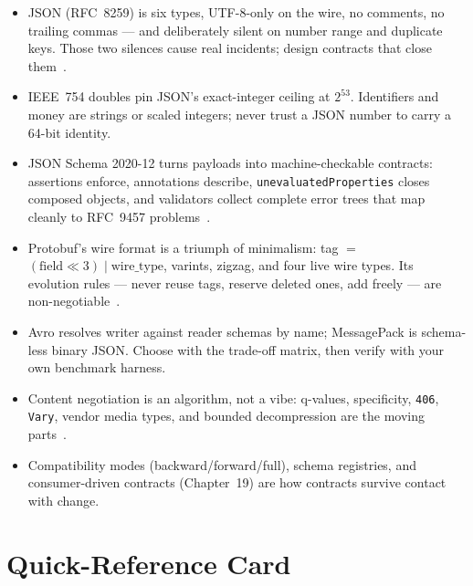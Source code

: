 \begin{itemize}
  \item JSON (RFC~8259) is six types, UTF-8-only on the wire, no comments, no
        trailing commas --- and deliberately silent on number range and duplicate
        keys. Those two silences cause real incidents; design contracts that close
        them~\cite{rfc8259}.
  \item IEEE~754 doubles pin JSON's exact-integer ceiling at $2^{53}$. Identifiers
        and money are strings or scaled integers; never trust a JSON number to
        carry a 64-bit identity.
  \item JSON Schema 2020-12 turns payloads into machine-checkable contracts:
        assertions enforce, annotations describe, \texttt{unevaluatedProperties}
        closes composed objects, and validators collect complete error trees that
        map cleanly to RFC~9457 problems~\cite{jsonschemadocs, rfc9457}.
  \item Protobuf's wire format is a triumph of minimalism: tag $=$
        $(\text{field} \ll 3) \mathbin{|} \text{wire\_type}$, varints, zigzag, and
        four live wire types. Its evolution rules --- never reuse tags, reserve
        deleted ones, add freely --- are non-negotiable~\cite{protobufdocs}.
  \item Avro resolves writer against reader schemas by name; MessagePack is
        schema-less binary JSON. Choose with the trade-off matrix, then verify with
        your own benchmark harness.
  \item Content negotiation is an algorithm, not a vibe: q-values, specificity,
        \texttt{406}, \texttt{Vary}, vendor media types, and bounded decompression
        are the moving parts~\cite{rfc9110}.
  \item Compatibility modes (backward/forward/full), schema registries, and
        consumer-driven contracts (Chapter~19) are how contracts survive contact
        with change.
\end{itemize}

\section{Quick-Reference Card}
\label{sec:ch4-quickref}

